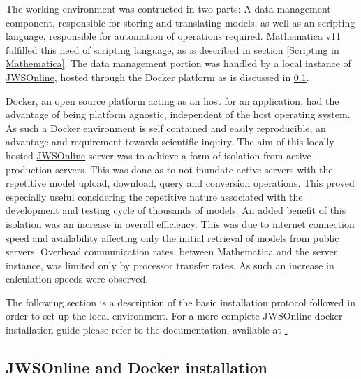 The working environment was contructed in two parts: A data management component, responsible for storing and translating models, as well as an scripting language, responsible for automation of operations required. Mathematica v11 fulfilled this need of scripting language, as is described in section \ref{Scripting in Mathematica}. The data management portion was handled by a local instance of \href{https://jjj.bio.vu.nl}{JWSOnline}, hosted through the Docker platform as is discussed in \ref{Docker Installation}. 

Docker, an open source platform acting as an host for an application, had the advantage of being platform agnostic, independent of the host operating system. As such a Docker environment is self contained and easily reproducible, an advantage and requirement towards scientific inquiry. The aim of this locally hosted \href{https://jjj.bio.vu.nl}{JWSOnline} server was to achieve a form of isolation from active production servers. This was done as to not inundate active servers with the repetitive model upload, download, query and conversion operations. This proved especially useful considering the repetitive nature associated with the development and testing cycle of thousands of models. An added benefit of this isolation was an increase in overall efficiency. This was due to internet connection speed and availability affecting only the initial retrieval of models from public servers. Overhead communication rates, between Mathematica and the server instance, was limited only by processor transfer rates. As such an increase in calculation speeds were observed. 

The following section is a description of the basic installation protocol followed in order to set up the local environment. For a more complete JWSOnline docker installation guide please refer to the documentation, available at \href{http://jws-docs.readthedocs.io/10_docker.html#building-the-jws-online-docker-image}.


\subsection{JWSOnline and Docker installation} \label{Docker Installation}

